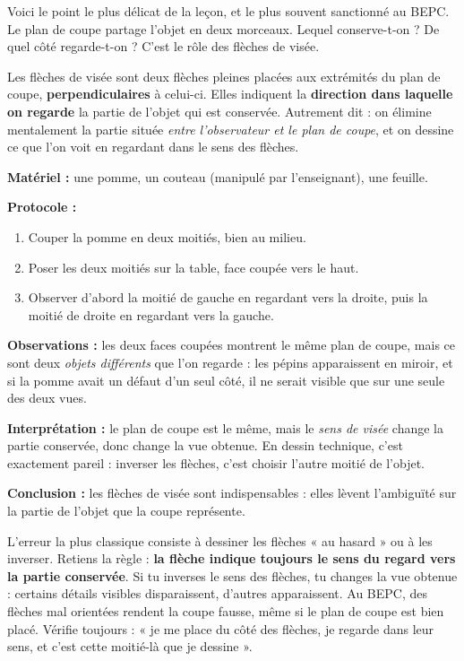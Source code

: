 \documentclass[11pt]{article}
\newcommand{\cle}[1]{{\popxbold\color{popdark}#1}}
\newcounter{popsec}
\newcounter{popsub}
\newcommand{\courssub}[1]{%
  \stepcounter{popsub}%
  \par\vspace{9pt}\noindent{\popxbold\fontsize{11.5}{13}\selectfont\color{popink}{\color{poporange}\thepopsec.\thepopsub}\hspace{6pt}#1}\par\nopagebreak\vspace{4pt}
}
\begin{document}
\courssub{Le sens de visée : les flèches}

Voici le point le plus délicat de la leçon, et le plus souvent sanctionné au BEPC. Le plan de coupe partage l'objet en deux morceaux. Lequel conserve-t-on ? De quel côté regarde-t-on ? C'est le rôle des \cle{flèches de visée}.

\begin{definition}
Les \cle{flèches de visée} sont deux flèches pleines placées aux extrémités du plan de coupe, \textbf{perpendiculaires} à celui-ci. Elles indiquent la \textbf{direction dans laquelle on regarde} la partie de l'objet qui est conservée. Autrement dit : on élimine mentalement la partie située \emph{entre l'observateur et le plan de coupe}, et on dessine ce que l'on voit en regardant dans le sens des flèches.
\end{definition}

\begin{experience}
\textbf{Matériel :} une pomme, un couteau (manipulé par l'enseignant), une feuille.

\textbf{Protocole :}
\begin{enumerate}
\item Couper la pomme en deux moitiés, bien au milieu.
\item Poser les deux moitiés sur la table, face coupée vers le haut.
\item Observer d'abord la moitié de gauche en regardant vers la droite, puis la moitié de droite en regardant vers la gauche.
\end{enumerate}

\textbf{Observations :} les deux faces coupées montrent le même plan de coupe, mais ce sont deux \emph{objets différents} que l'on regarde : les pépins apparaissent en miroir, et si la pomme avait un défaut d'un seul côté, il ne serait visible que sur une seule des deux vues.

\textbf{Interprétation :} le plan de coupe est le même, mais le \emph{sens de visée} change la partie conservée, donc change la vue obtenue. En dessin technique, c'est exactement pareil : inverser les flèches, c'est choisir l'autre moitié de l'objet.

\textbf{Conclusion :} les flèches de visée sont indispensables : elles lèvent l'ambiguïté sur la partie de l'objet que la coupe représente.
\end{experience}

\begin{attention}
L'erreur la plus classique consiste à dessiner les flèches « au hasard » ou à les inverser. Retiens la règle : \textbf{la flèche indique toujours le sens du regard vers la partie conservée}. Si tu inverses le sens des flèches, tu changes la vue obtenue : certains détails visibles disparaissent, d'autres apparaissent. Au BEPC, des flèches mal orientées rendent la coupe fausse, même si le plan de coupe est bien placé. Vérifie toujours : « je me place du côté des flèches, je regarde dans leur sens, et c'est cette moitié-là que je dessine ».
\end{attention}
\end{document}
